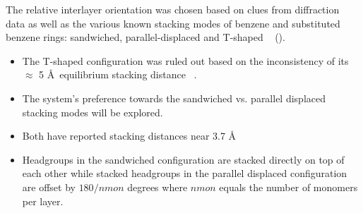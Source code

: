 \documentclass{article}
\newcommand{\angstrom}{\textup{\AA}}
\begin{document}
  The relative interlayer orientation was chosen based on clues from 
  diffraction data as well as the various known stacking modes of benzene 
  and substituted benzene rings: sandwiched, parallel-displaced and T-shaped
  ~\cite{sinnokrot_estimates_2002} ().
  \begin{itemize}
    \item The T-shaped configuration was ruled out based on the inconsistency of
    its $\approx$ 5 \angstrom~equilibrium stacking distance ~\cite{sinnokrot_estimates_2002}.
    \item The system's preference towards the sandwiched vs. parallel displaced 
    stacking modes will be explored.
    \item Both have reported stacking distances near 3.7 \angstrom %
    \item Headgroups in the sandwiched configuration are stacked directly on top of
    each other while stacked headgroups in the parallel displaced configuration are offset 
    by $180/nmon$ degrees where $nmon$ equals the number of monomers per layer.
  \end{itemize}
\end{document}
